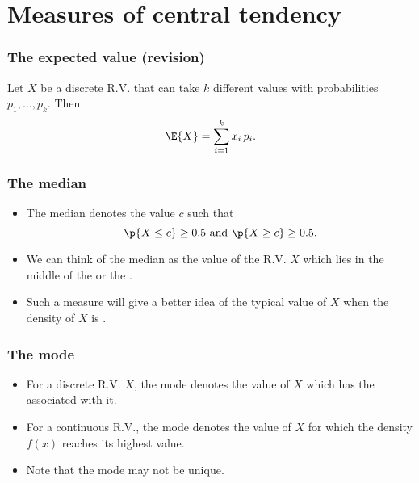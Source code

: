 \documentclass[compress]{beamer}\usepackage[]{graphicx}\usepackage[]{xcolor}
\begin{document}
\section{Measures of central tendency}

\begin{frame}[fragile]
  \frametitle{The expected value (revision)}
    Let $X$ be a discrete R.V. that can take $k$ different values with probabilities $p_1, \dots, p_k$. Then
    \[ \E{X}=\sum_{i=1}^k x_i\, p_i. \]
\end{frame}


\begin{frame}[fragile]
  \frametitle{The median}
    \begin{itemize}
      \item The median denotes the value $c$ such that
        \[ \p{X \leq c} \geq 0.5 \text{ and } \p{X \geq c} \geq 0.5. \]
      \item We can think of the median as the value of the R.V. $X$ which lies in the middle of the  or the .
      \item Such a measure will give a better idea of the typical value of $X$ when the density of $X$ is .
    \end{itemize}
\end{frame}


\begin{frame}[fragile]
  \frametitle{The mode}
    \begin{itemize}
      \item For a discrete R.V. $X$, the mode denotes the value of $X$ which has the  associated with it.
      \item For a continuous R.V., the mode denotes the value of $X$ for which the density $f(x)$ reaches its highest value.
      \item Note that the mode may not be unique.
    \end{itemize}
\end{frame}
\end{document}
